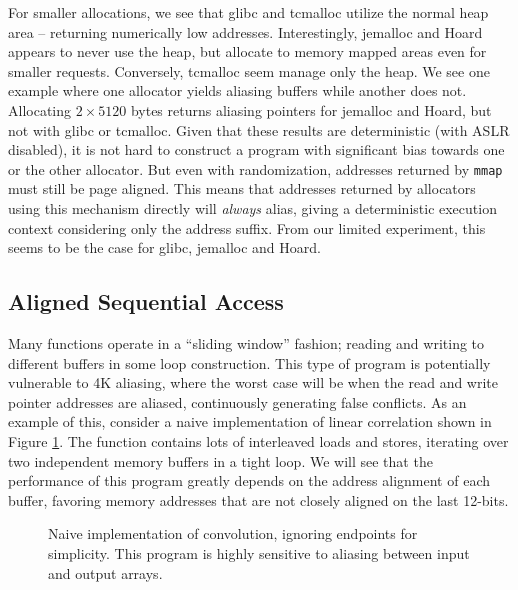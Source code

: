 \documentclass[prodmode,acmtaco]{acmsmall}
\begin{document}
{For smaller allocations, we see that glibc and tcmalloc utilize the normal heap area -- returning numerically low addresses.
Interestingly, jemalloc and Hoard appears to never use the heap, but allocate to memory mapped areas even for smaller requests.
Conversely, tcmalloc seem manage only the heap.
We see one example where one allocator yields aliasing buffers while another does not.
Allocating $2 \times 5120$ bytes returns aliasing pointers for jemalloc and Hoard, but not with glibc or tcmalloc.
Given that these results are deterministic (with ASLR disabled), it is not hard to construct a program with significant bias towards one or the other allocator.
But even with randomization, addresses returned by \texttt{mmap} must still be page aligned.
This means that addresses returned by allocators using this mechanism directly will \emph{always} alias, giving a deterministic execution context considering only the address suffix.
From our limited experiment, this seems to be the case for glibc, jemalloc and Hoard.


\subsection{Aligned Sequential Access}
Many functions operate in a ``sliding window'' fashion; reading and writing to different buffers in some loop construction.
This type of program is potentially vulnerable to 4K aliasing, where the worst case will be when the read and write pointer addresses are aliased, continuously generating false conflicts.
As an example of this, consider a naive implementation of linear correlation shown in Figure \ref{lst:conv}.
The function contains lots of interleaved loads and stores, iterating over two independent memory buffers in a tight loop.
We will see that the performance of this program greatly depends on the address alignment of each buffer, favoring memory addresses that are not closely aligned on the last 12-bits.

\begin{figure}[t]
  \centering
  
  \caption{Naive implementation of convolution, ignoring endpoints for simplicity. This program is highly sensitive to aliasing between input and output arrays.}
  \label{lst:conv}
\end{figure}

}
\end{document}

